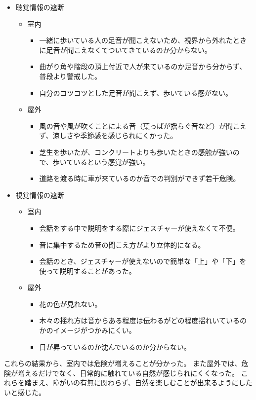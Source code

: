 \documentclass[12pt,a4paper]{report}
\begin{document}
\begin{itemize}
  \item 聴覚情報の遮断
  \begin{itemize}
    \item 室内
    \begin{itemize}
      \item 一緒に歩いている人の足音が聞こえないため、視界から外れたときに足音が聞こえなくてついてきているのか分からない。
      \item 曲がり角や階段の頂上付近で人が来ているのか足音から分からず、普段より警戒した。
      \item 自分のコツコツとした足音が聞こえず、歩いている感がない。
    \end{itemize}
    \item 屋外
    \begin{itemize}
      \item 風の音や風が吹くことによる音（葉っぱが揺らぐ音など）が聞こえず、涼しさや季節感を感じられにくかった。
      \item 芝生を歩いたが、コンクリートよりも歩いたときの感触が強いので、歩いているという感覚が強い。
      \item 道路を渡る時に車が来ているのか音での判別ができず若干危険。
    \end{itemize}
  \end{itemize}
  \item 視覚情報の遮断
  \begin{itemize}
    \item 室内
    \begin{itemize}
      \item 会話をする中で説明をする際にジェスチャーが使えなくて不便。
      \item 音に集中するため音の聞こえ方がより立体的になる。
      \item 会話のとき、ジェスチャーが使えないので簡単な「上」や「下」を使って説明することがあった。
    \end{itemize}
    \item 屋外
    \begin{itemize}
      \item 花の色が見れない。
      \item 木々の揺れ方は音からある程度は伝わるがどの程度揺れいているのかのイメージがつかみにくい。
      \item 日が昇っているのか沈んでいるのか分からない。
    \end{itemize}
  \end{itemize}
\end{itemize}
これらの結果から、室内では危険が増えることが分かった。
また屋外では、危険が増えるだけでなく、日常的に触れている自然が感じられにくくなった。
これらを踏まえ、障がいの有無に関わらず、自然を楽しむことが出来るようにしたいと感じた。
\end{document}
